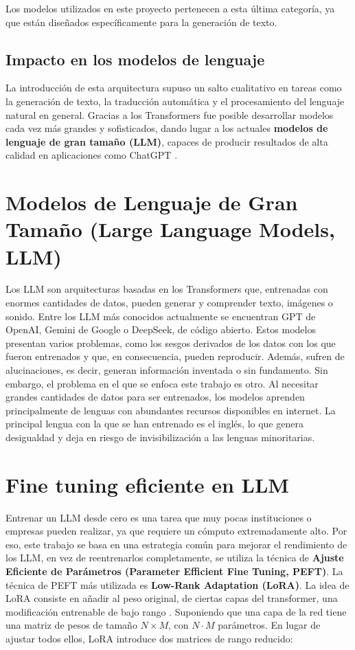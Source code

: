 Los modelos utilizados en este proyecto pertenecen a esta última categoría, ya que están diseñados específicamente para la generación de texto.

\subsection{Impacto en los modelos de lenguaje}

La introducción de esta arquitectura supuso un salto cualitativo en tareas como la generación de texto, la traducción automática y el procesamiento del lenguaje natural en general. Gracias a los Transformers fue posible desarrollar modelos cada vez más grandes y sofisticados, dando lugar a los actuales \textbf{modelos de lenguaje de gran tamaño (LLM)}, capaces de producir resultados de alta calidad en aplicaciones como ChatGPT \cite{vaswani2023attentionneed}.


\section{Modelos de Lenguaje de Gran Tamaño (Large Language Models, LLM)}

Los LLM son arquitecturas basadas en los Transformers que, entrenadas con enormes cantidades de datos, pueden generar y comprender texto, imágenes o sonido. Entre los LLM más conocidos actualmente se encuentran GPT de OpenAI, Gemini de Google o DeepSeek, de código abierto. Estos modelos presentan varios problemas, como los sesgos derivados de los datos con los que fueron entrenados y que, en consecuencia, pueden reproducir. Además, sufren de alucinaciones, es decir, generan información inventada o sin fundamento. Sin embargo, el problema en el que se enfoca este trabajo es otro. Al necesitar grandes cantidades de datos para ser entrenados, los modelos aprenden principalmente de lenguas con abundantes recursos disponibles en internet. La principal lengua con la que se han entrenado es el inglés, lo que genera desigualdad y deja en riesgo de invisibilización a las lenguas minoritarias.

\section{Fine tuning eficiente en LLM}

Entrenar un LLM desde cero es una tarea que muy pocas instituciones o empresas pueden realizar, ya que requiere un cómputo extremadamente alto. Por eso, este trabajo se basa en una estrategia común para mejorar el rendimiento de los LLM, en vez de reentrenarlos completamente, se utiliza la técnica de \textbf{Ajuste Eficiente de Parámetros (Parameter Efficient Fine Tuning, PEFT)}. La técnica de PEFT más utilizada es \textbf{Low-Rank Adaptation (LoRA)}. La idea de LoRA consiste en añadir al peso original, de ciertas capas del transformer, una modificación entrenable de bajo rango \cite{gang:hal-04983079}. Suponiendo que una capa de la red tiene una matriz de pesos de tamaño \(N \times M\), con \(N \cdot M\) parámetros. En lugar de ajustar todos ellos, LoRA introduce dos matrices de rango reducido: 



